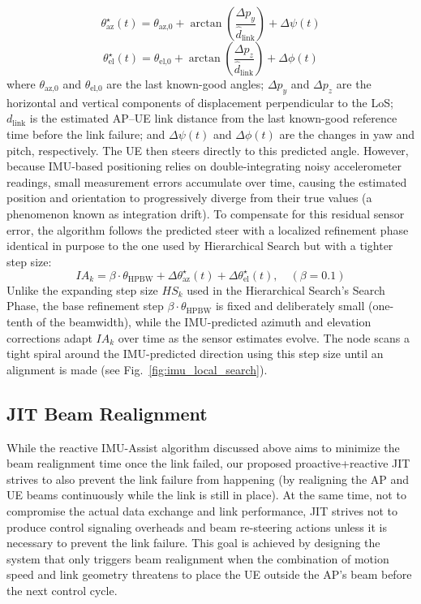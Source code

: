 \documentclass[fleqn,10pt]{wlscirep}
\begin{document}
\begin{equation}
    \theta_{\text{az}}^{\star}(t) = \theta_{\text{az,0}} + \arctan\!\left(\frac{\Delta p_{y}}{\hat{d}_{\text{link}}}\right) + \Delta\psi(t)
\end{equation}
\begin{equation}
    \theta_{\text{el}}^{\star}(t) = \theta_{\text{el,0}} + \arctan\!\left(\frac{\Delta p_{z}}{\hat{d}_{\text{link}}}\right) + \Delta\phi(t)
\end{equation}
where $\theta_{\text{az,0}}$ and $\theta_{\text{el,0}}$ are the last known-good angles; $\Delta p_y$ and $\Delta p_z$ are the horizontal and vertical components of displacement perpendicular to the LoS; $d_{\text{link}}$ is the estimated AP--UE link distance from the last known-good reference time before the link failure; and $\Delta\psi(t)$ and $\Delta\phi(t)$ are the changes in yaw and pitch, respectively. The UE then steers directly to this predicted angle. However, because IMU-based positioning relies on double-integrating noisy accelerometer readings, small measurement errors accumulate over time, causing the estimated position and orientation to progressively diverge from their true values (a phenomenon known as integration drift). To compensate for this residual sensor error, the algorithm follows the predicted steer with a localized refinement phase identical in purpose to the one used by Hierarchical Search but with a tighter step size:
\begin{equation}
    IA_k = \beta \cdot \theta_{\text{HPBW}} + \Delta\theta_{\text{az}}^{\star}(t) + \Delta\theta_{\text{el}}^{\star}(t), \quad (\beta = 0.1)
\end{equation}
Unlike the expanding step size $HS_k$ used in the Hierarchical Search's Search Phase, the base refinement step $\beta \cdot \theta_{\text{HPBW}}$ is fixed and deliberately small (one-tenth of the beamwidth), while the IMU-predicted azimuth and elevation corrections adapt $IA_k$ over time as the sensor estimates evolve. The node scans a tight spiral around the IMU-predicted direction using this step size until an alignment is made (see Fig.~\ref{fig:imu_local_search}).

\subsection*{JIT Beam Realignment}
While the reactive IMU-Assist algorithm discussed above aims to minimize the beam realignment time once the link failed, our proposed proactive+reactive JIT strives to also prevent the link failure from happening (by realigning the AP and UE beams continuously while the link is still in place). At the same time, not to compromise the actual data exchange and link performance, JIT strives not to produce control signaling overheads and beam re-steering actions unless it is necessary to prevent the link failure. This goal is achieved by designing the system that only triggers beam realignment when the combination of motion speed and link geometry threatens to place the UE outside the AP's beam before the next control cycle.
\end{document}
